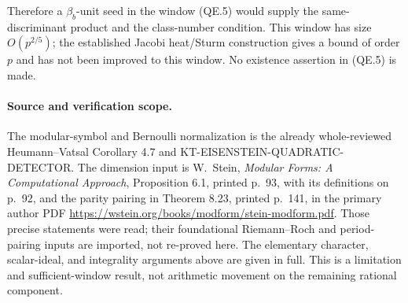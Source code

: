 Therefore a $\beta_b$-unit seed in the window (QE.5) would supply
the same-discriminant product and the class-number condition.
This window has size $O(p^{2/5})$; the established Jacobi
heat/Sturm construction gives a bound of order $p$ and has not
been improved to this window.  No existence assertion in (QE.5)
is made.

\paragraph{Source and verification scope.}
The modular-symbol and Bernoulli normalization is the already
whole-reviewed Heumann--Vatsal Corollary 4.7 and
KT-EISENSTEIN-QUADRATIC-DETECTOR.  The dimension input is
W.~Stein, \emph{Modular Forms: A Computational Approach},
Proposition 6.1, printed p.~93, with its definitions on p.~92,
and the parity pairing in Theorem 8.23, printed p.~141,
in the primary author PDF
\url{https://wstein.org/books/modform/stein-modform.pdf}.
Those precise statements were read; their foundational
Riemann--Roch and period-pairing inputs are imported,
not re-proved here.
The elementary character, scalar-ideal, and integrality
arguments above are given in full.  This is a limitation and
sufficient-window result, not arithmetic movement on the
remaining rational component.
